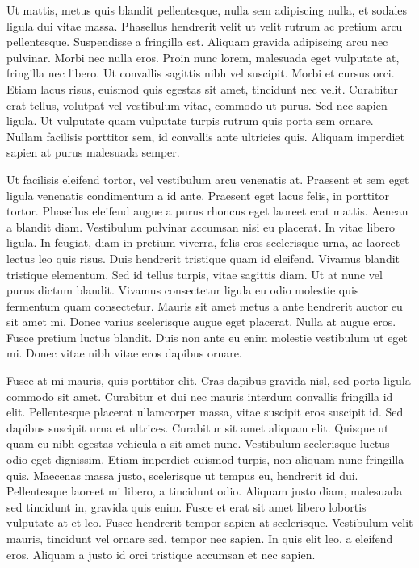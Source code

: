 Ut mattis, metus quis blandit pellentesque, nulla sem adipiscing nulla, et sodales ligula dui vitae massa.
Phasellus hendrerit velit ut velit rutrum ac pretium arcu pellentesque.
Suspendisse a fringilla est.
Aliquam gravida adipiscing arcu nec pulvinar.
Morbi nec nulla eros.
Proin nunc lorem, malesuada eget vulputate at, fringilla nec libero.
Ut convallis sagittis nibh vel suscipit.
Morbi et cursus orci.
Etiam lacus risus, euismod quis egestas sit amet, tincidunt nec velit.
Curabitur erat tellus, volutpat vel vestibulum vitae, commodo ut purus.
Sed nec sapien ligula.
Ut vulputate quam vulputate turpis rutrum quis porta sem ornare.
Nullam facilisis porttitor sem, id convallis ante ultricies quis.
Aliquam imperdiet sapien at purus malesuada semper.

Ut facilisis eleifend tortor, vel vestibulum arcu venenatis at.
Praesent et sem eget ligula venenatis condimentum a id ante.
Praesent eget lacus felis, in porttitor tortor.
Phasellus eleifend augue a purus rhoncus eget laoreet erat mattis.
Aenean a blandit diam.
Vestibulum pulvinar accumsan nisi eu placerat.
In vitae libero ligula.
In feugiat, diam in pretium viverra, felis eros scelerisque urna, ac laoreet lectus leo quis risus.
Duis hendrerit tristique quam id eleifend.
Vivamus blandit tristique elementum.
Sed id tellus turpis, vitae sagittis diam.
Ut at nunc vel purus dictum blandit.
Vivamus consectetur ligula eu odio molestie quis fermentum quam consectetur.
Mauris sit amet metus a ante hendrerit auctor eu sit amet mi.
Donec varius scelerisque augue eget placerat.
Nulla at augue eros.
Fusce pretium luctus blandit.
Duis non ante eu enim molestie vestibulum ut eget mi.
Donec vitae nibh vitae eros dapibus ornare.

Fusce at mi mauris, quis porttitor elit.
Cras dapibus gravida nisl, sed porta ligula commodo sit amet.
Curabitur et dui nec mauris interdum convallis fringilla id elit.
Pellentesque placerat ullamcorper massa, vitae suscipit eros suscipit id.
Sed dapibus suscipit urna et ultrices.
Curabitur sit amet aliquam elit.
Quisque ut quam eu nibh egestas vehicula a sit amet nunc.
Vestibulum scelerisque luctus odio eget dignissim.
Etiam imperdiet euismod turpis, non aliquam nunc fringilla quis.
Maecenas massa justo, scelerisque ut tempus eu, hendrerit id dui.
Pellentesque laoreet mi libero, a tincidunt odio.
Aliquam justo diam, malesuada sed tincidunt in, gravida quis enim.
Fusce et erat sit amet libero lobortis vulputate at et leo.
Fusce hendrerit tempor sapien at scelerisque.
Vestibulum velit mauris, tincidunt vel ornare sed, tempor nec sapien.
In quis elit leo, a eleifend eros.
Aliquam a justo id orci tristique accumsan et nec sapien.